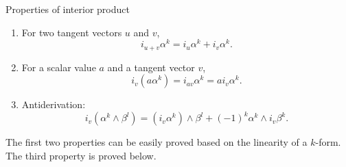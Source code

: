\documentclass[11pt, a4paper]{book}
\begin{document}
Properties of interior product
\begin{enumerate}
\item For two tangent vectors $u$ and $v$,
  \begin{equation}
    \label{eq:interior-product-linearity-summation}
    i_{u+v}\alpha^k = i_u\alpha^k + i_v\alpha^k.
  \end{equation}
\item For a scalar value $a$ and a tangent vector $v$,
  \begin{equation}
    \label{eq:interior-product-linearity-scalar-product}
    i_v(a\alpha^k) = i_{av}\alpha^k = ai_v\alpha^k.
  \end{equation}
\item Antiderivation:
  \begin{equation}
    \label{eq:interior-product-antiderivation}
    i_v(\alpha^k \wedge \beta^l) = (i_v\alpha^k) \wedge \beta^l + (-1)^k \alpha^k \wedge
    i_v\beta^k.
  \end{equation}
\end{enumerate}
The first two properties can be easily proved based on the linearity of a $k$-form. The
third property is proved below.
\end{document}

